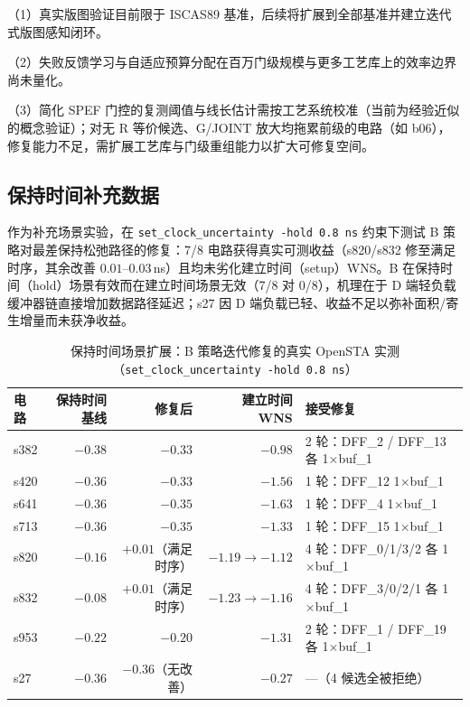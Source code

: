 \documentclass[journal]{IEEEtran}
\begin{document}
（1）真实版图验证目前限于 ISCAS89 基准，后续将扩展到全部基准并建立迭代式版图感知闭环。

（2）失败反馈学习与自适应预算分配在百万门级规模与更多工艺库上的效率边界尚未量化。

（3）简化 SPEF 门控的复测阈值与线长估计需按工艺系统校准（当前为经验近似的概念验证）；对无 R 等价候选、G/JOINT 放大均拖累前级的电路（如 b06），修复能力不足，需扩展工艺库与门级重组能力以扩大可修复空间。

\begin{appendices}
\section{保持时间补充数据}\label{app:hold}

作为补充场景实验，在 \texttt{set\_clock\_uncertainty -hold 0.8\,ns} 约束下测试 B 策略对最差保持松弛路径的修复：7/8 电路获得真实可测收益（s820/s832 修至满足时序，其余改善 $0.01$--$0.03\,$ns）且均未劣化建立时间（setup）WNS。B 在保持时间（hold）场景有效而在建立时间场景无效（7/8 对 0/8），机理在于 D 端轻负载缓冲器链直接增加数据路径延迟；s27 因 D 端负载已轻、收益不足以弥补面积/寄生增量而未获净收益。

\begin{table}[!htbp]
\centering
\caption{保持时间场景扩展：B 策略迭代修复的真实 OpenSTA 实测（\texttt{set\_clock\_uncertainty -hold 0.8\,ns}）}
\label{tab:hold}
\scriptsize
\setlength{\tabcolsep}{2pt}
\begin{tabular}{lrrrp{2.0cm}}
\toprule
\textbf{电路} & \textbf{保持时间基线} & \textbf{修复后} & \textbf{建立时间 WNS} & \textbf{接受修复} \\
\midrule
s382 & $-0.38$ & $-0.33$ & $-0.98$ & 2 轮：DFF\_2 / DFF\_13 各 1$\times$buf\_1 \\
s420 & $-0.36$ & $-0.33$ & $-1.56$ & 1 轮：DFF\_12 1$\times$buf\_1 \\
s641 & $-0.36$ & $-0.35$ & $-1.63$ & 1 轮：DFF\_4 1$\times$buf\_1 \\
s713 & $-0.36$ & $-0.35$ & $-1.33$ & 1 轮：DFF\_15 1$\times$buf\_1 \\
s820 & $-0.16$ & $+0.01$（满足时序） & $-1.19\rightarrow -1.12$ & 4 轮：DFF\_0/1/3/2 各 1$\times$buf\_1 \\
s832 & $-0.08$ & $+0.01$（满足时序） & $-1.23\rightarrow -1.16$ & 4 轮：DFF\_3/0/2/1 各 1$\times$buf\_1 \\
s953 & $-0.22$ & $-0.20$ & $-1.31$ & 2 轮：DFF\_1 / DFF\_19 各 1$\times$buf\_1 \\
s27 & $-0.36$ & $-0.36$（无改善） & $-0.27$ & ---（4 候选全被拒绝） \\
\bottomrule
\end{tabular}
\end{table}

\end{appendices}
\end{document}
